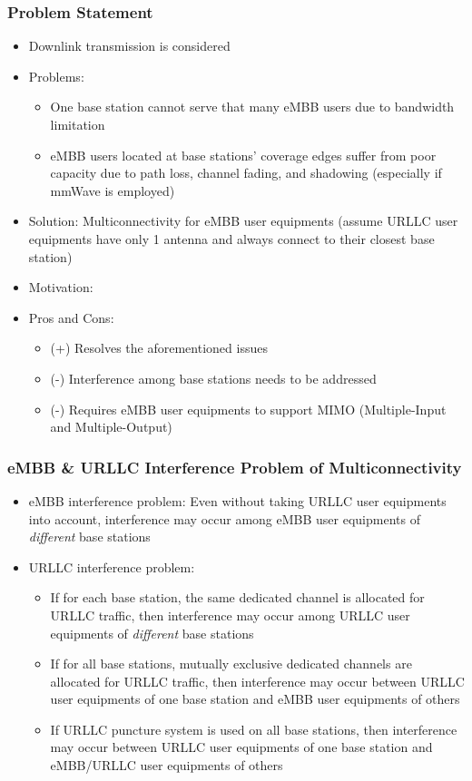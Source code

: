 \documentclass{beamer}
\begin{document}
\begin{frame}
  \frametitle{Problem Statement}
  \begin{itemize}
    \item Downlink transmission is considered
    \item Problems:
      \begin{itemize}
        \item One base station cannot serve that many eMBB users due to bandwidth limitation
        \item eMBB users located at base stations' coverage edges suffer from poor capacity due to path loss, channel fading, and shadowing (especially if mmWave is employed)
      \end{itemize}
    \item Solution: Multiconnectivity for eMBB user equipments (assume URLLC user equipments have only 1 antenna and always connect to their closest base station)
    \item Motivation:
    \item Pros and Cons:
      \begin{itemize}
        \item (+) Resolves the aforementioned issues
        \item (-) Interference among base stations needs to be addressed
        \item (-) Requires eMBB user equipments to support MIMO (Multiple-Input and Multiple-Output)
      \end{itemize}
  \end{itemize}
\end{frame}

\begin{frame}
  \frametitle{eMBB \& URLLC Interference Problem of Multiconnectivity}
  \begin{itemize}
    \item eMBB interference problem: Even without taking URLLC user equipments into account, interference may occur among eMBB user equipments of \emph{different} base stations
    \item URLLC interference problem:
      \begin{itemize}
        \item If for each base station, the same dedicated channel is allocated for URLLC traffic, then interference may occur among URLLC user equipments of \emph{different} base stations
        \item If for all base stations, mutually exclusive dedicated channels are allocated for URLLC traffic, then interference may occur between URLLC user equipments of one base station and eMBB user equipments of others
        \item If URLLC puncture system is used on all base stations, then interference may occur between URLLC user equipments of one base station and eMBB/URLLC user equipments of others
      \end{itemize}
  \end{itemize}
\end{frame}
\end{document}
